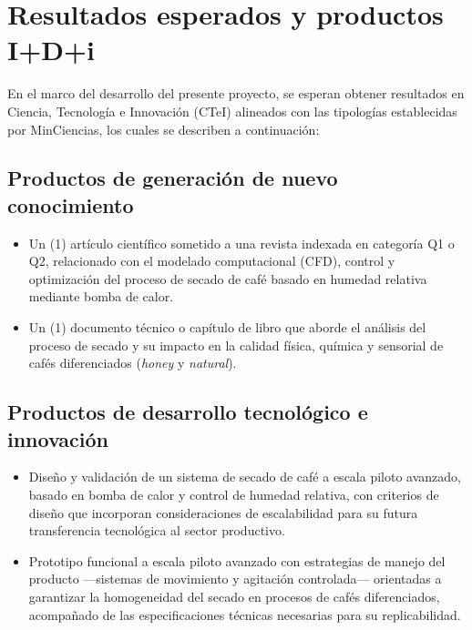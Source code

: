 \section{Resultados esperados y productos I+D+i}

En el marco del desarrollo del presente proyecto, se esperan obtener resultados en 
Ciencia, Tecnología e Innovación (CTeI) alineados con las tipologías establecidas por 
MinCiencias, los cuales se describen a continuación:

\subsection{Productos de generación de nuevo conocimiento}
\begin{itemize}
    \item Un (1) artículo científico sometido a una revista indexada en categoría Q1 
    o Q2, relacionado con el modelado computacional (CFD), control y optimización del 
    proceso de secado de café basado en humedad relativa mediante bomba de calor.
    \item Un (1) documento técnico o capítulo de libro que aborde el análisis del 
    proceso de secado y su impacto en la calidad física, química y sensorial de cafés 
    diferenciados (\textit{honey} y \textit{natural}).
\end{itemize}

\subsection{Productos de desarrollo tecnológico e innovación}
\begin{itemize}
    \item Diseño y validación de un sistema de secado de café a escala piloto avanzado, 
    basado en bomba de calor y control de humedad relativa, con criterios de diseño 
    que incorporan consideraciones de escalabilidad para su futura transferencia 
    tecnológica al sector productivo.
    \item Prototipo funcional a escala piloto avanzado con estrategias de manejo del 
    producto —sistemas de movimiento y agitación controlada— orientadas a garantizar 
    la homogeneidad del secado en procesos de cafés diferenciados, acompañado de las 
    especificaciones técnicas necesarias para su replicabilidad.
\end{itemize}


